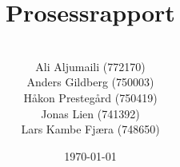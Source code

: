\newcommand{\mytitle}{Prosessrapport}
\newcommand{\mygroupnumber}{2}
\newcommand{\myauthor}{\\Ali Aljumaili (772170) \\ Anders Gildberg (750003) \\ Håkon Prestegård (750419) \\ Jonas Lien (741392) \\ Lars Kambe Fjæra (748650)}


\title{\mytitle}
\author{\myauthor}
\date{\today}

